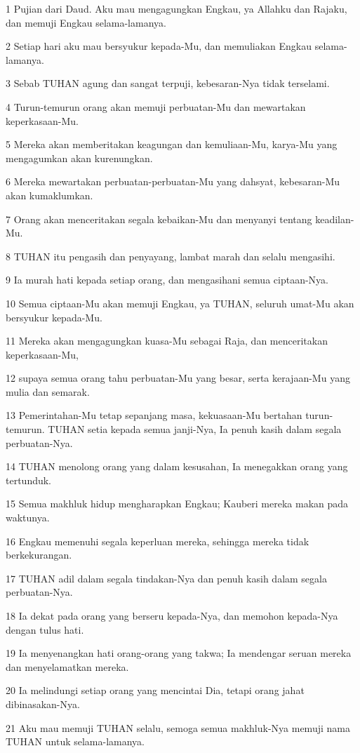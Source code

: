 \par 1 Pujian dari Daud. Aku mau mengagungkan Engkau, ya Allahku dan Rajaku, dan memuji Engkau selama-lamanya.
\par 2 Setiap hari aku mau bersyukur kepada-Mu, dan memuliakan Engkau selama-lamanya.
\par 3 Sebab TUHAN agung dan sangat terpuji, kebesaran-Nya tidak terselami.
\par 4 Turun-temurun orang akan memuji perbuatan-Mu dan mewartakan keperkasaan-Mu.
\par 5 Mereka akan memberitakan keagungan dan kemuliaan-Mu, karya-Mu yang mengagumkan akan kurenungkan.
\par 6 Mereka mewartakan perbuatan-perbuatan-Mu yang dahsyat, kebesaran-Mu akan kumaklumkan.
\par 7 Orang akan menceritakan segala kebaikan-Mu dan menyanyi tentang keadilan-Mu.
\par 8 TUHAN itu pengasih dan penyayang, lambat marah dan selalu mengasihi.
\par 9 Ia murah hati kepada setiap orang, dan mengasihani semua ciptaan-Nya.
\par 10 Semua ciptaan-Mu akan memuji Engkau, ya TUHAN, seluruh umat-Mu akan bersyukur kepada-Mu.
\par 11 Mereka akan mengagungkan kuasa-Mu sebagai Raja, dan menceritakan keperkasaan-Mu,
\par 12 supaya semua orang tahu perbuatan-Mu yang besar, serta kerajaan-Mu yang mulia dan semarak.
\par 13 Pemerintahan-Mu tetap sepanjang masa, kekuasaan-Mu bertahan turun-temurun. TUHAN setia kepada semua janji-Nya, Ia penuh kasih dalam segala perbuatan-Nya.
\par 14 TUHAN menolong orang yang dalam kesusahan, Ia menegakkan orang yang tertunduk.
\par 15 Semua makhluk hidup mengharapkan Engkau; Kauberi mereka makan pada waktunya.
\par 16 Engkau memenuhi segala keperluan mereka, sehingga mereka tidak berkekurangan.
\par 17 TUHAN adil dalam segala tindakan-Nya dan penuh kasih dalam segala perbuatan-Nya.
\par 18 Ia dekat pada orang yang berseru kepada-Nya, dan memohon kepada-Nya dengan tulus hati.
\par 19 Ia menyenangkan hati orang-orang yang takwa; Ia mendengar seruan mereka dan menyelamatkan mereka.
\par 20 Ia melindungi setiap orang yang mencintai Dia, tetapi orang jahat dibinasakan-Nya.
\par 21 Aku mau memuji TUHAN selalu, semoga semua makhluk-Nya memuji nama TUHAN untuk selama-lamanya.

